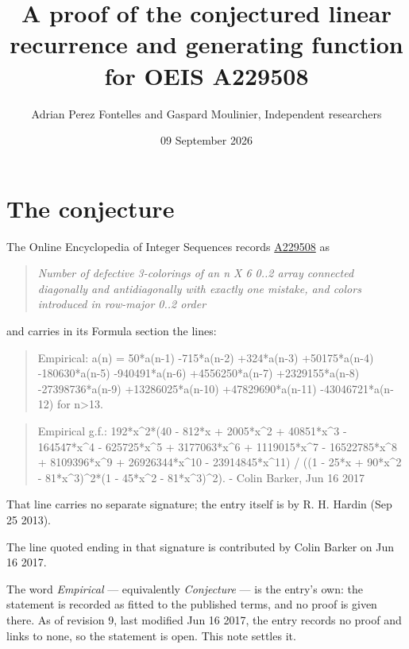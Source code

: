 \documentclass[11pt]{article}
\title{A proof of the conjectured linear recurrence and generating function for OEIS A229508}
\author{Adrian Perez Fontelles and Gaspard Moulinier, Independent researchers}
\date{09 September 2026}
\theoremstyle{definition}
\begin{document}
\maketitle
\section{The conjecture}

The Online Encyclopedia of Integer Sequences records \href{https://oeis.org/A229508}{A229508} as

\begin{quote}\itshape Number of defective 3-colorings of an n X 6 0..2 array connected diagonally and antidiagonally with exactly one mistake, and colors introduced in row-major 0..2 order\end{quote}

and carries in its Formula section the lines:

\begin{quote}\ttfamily Empirical: a(n) = 50*a(n-1) -715*a(n-2) +324*a(n-3) +50175*a(n-4) -180630*a(n-5) -940491*a(n-6) +4556250*a(n-7) +2329155*a(n-8) -27398736*a(n-9) +13286025*a(n-10) +47829690*a(n-11) -43046721*a(n-12) for n>13.\end{quote}

\begin{quote}\ttfamily Empirical g.f.: 192*x\textasciicircum{}2*(40 - 812*x + 2005*x\textasciicircum{}2 + 40851*x\textasciicircum{}3 - 164547*x\textasciicircum{}4 - 625725*x\textasciicircum{}5 + 3177063*x\textasciicircum{}6 + 1119015*x\textasciicircum{}7 - 16522785*x\textasciicircum{}8 + 8109396*x\textasciicircum{}9 + 26926344*x\textasciicircum{}10 - 23914845*x\textasciicircum{}11) / ((1 - 25*x + 90*x\textasciicircum{}2 - 81*x\textasciicircum{}3)\textasciicircum{}2*(1 - 45*x\textasciicircum{}2 - 81*x\textasciicircum{}3)\textasciicircum{}2). - Colin Barker, Jun 16 2017\end{quote}

That line carries no separate signature; the entry itself is by R. H. Hardin (Sep 25 2013).

The line quoted ending in that signature is contributed by Colin Barker on Jun 16 2017.

The word {\itshape Empirical} --- equivalently {\itshape Conjecture} --- is the entry's own: the statement is recorded as fitted to the published terms, and no proof is given there. As of revision 9, last modified Jun 16 2017, the entry records no proof and links to none, so the statement is open. This note settles it.
\end{document}
